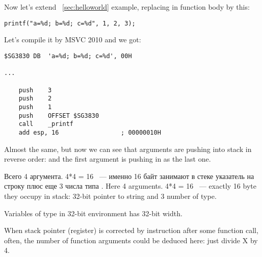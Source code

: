 ﻿%

\section{}

{Now let's extend ~\ref{sec:helloworld} example, replacing \printf in 
\main function body by this:}

\begin{lstlisting}
printf("a=%d; b=%d; c=%d", 1, 2, 3);
\end{lstlisting}

{Let's compile it by MSVC 2010 and we got:}

\begin{lstlisting}
$SG3830	DB	'a=%d; b=%d; c=%d', 00H

...

	push	3
	push	2
	push	1
	push	OFFSET $SG3830
	call	_printf
	add	esp, 16					; 00000010H
\end{lstlisting}

{Almost the same, but now we can see that \printf arguments are pushing into stack in reverse order: and the first argument is pushing in as the last one.}

\IFRU
{Всего 4 аргумента. 4*4 = 16 ~--- именно 16 байт занимают в стеке указатель на строку плюс еще 
3 числа типа \Tint.}
{Here 4 arguments. 4*4 = 16 ~--- exactly 16 byte they occupy in stack: 32-bit pointer to string and 
3 number of \Tint type.}

{Variables of \Tint type in 32-bit environment has 32-bit width.}

{When stack pointer (\ESP register) is corrected by  instruction after some function 
call, often, the number of function arguments could be deduced here: just divide X by 4.}

